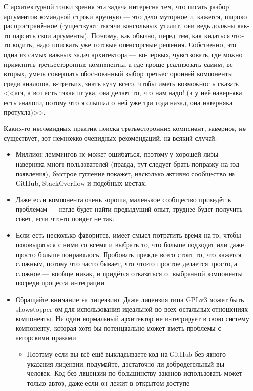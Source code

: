 \documentclass[a5paper]{article}
\begin{document}
С архитектурной точки зрения эта задача интересна тем, что писать разбор аргументов командной строки вручную --- это дело муторное и, кажется, широко распространённое (существуют тысячи консольных утилит, они ведь должны как-то парсить свои аргументы). Поэтому, как обычно, перед тем, как кидаться что-то кодить, надо поискать уже готовые опенсорсные решения. Собственно, это одна из самых важных задач архитектора --- во-первых, чувствовать, где можно применить третьесторонние компоненты, а где проще реализовать самим, во-вторых, уметь совершать обоснованный выбор третьесторонней компоненты среди аналогов, в-третьих, знать кучу всего, чтобы иметь возможность сказать <<ага, а вот есть такая штука, она делает то, что нам надо! (и у неё наверняка есть аналоги, потому что я слышал о ней уже три года назад, она наверняка протухла)>>.

Каких-то неочевидных практик поиска третьесторонних компонент, наверное, не существует, вот немножко очевидных рекомендаций, на всякий случай.
\begin{itemize}
	\item Миллион леммингов не может ошибаться, поэтому у хорошей либы наверняка много пользователей (правда, тут следует брать поправку на год появления), быстрое гугление покажет, насколько активно сообщество на GitHub, StackOverflow и подобных местах.
	\item Даже если компонента очень хороша, маленькое сообщество приведёт к проблемам --- негде будет найти предыдущий опыт, труднее будет получить совет, если что-то пойдёт не так.
	\item Если есть несколько фаворитов, имеет смысл потратить время на то, чтобы поковыряться с ними со всеми и выбрать то, что больше подходит или даже просто больше понравилось. Пробовать прежде всего стоит то, что кажется сложным, потому что часто бывает, что что-то простое делается просто, а сложное --- вообще никак, и придётся отказаться от выбранной компоненты посреди процесса интеграции. 
	\item Обращайте внимание на лицензию. Даже лицензия типа GPLv3 может быть showstopper-ом для использования идеальной во всех остальных отношениях компоненты. Ни один нормальный архитектор не интегрирует в свою систему компоненту, которая хотя бы потенциально может иметь проблемы с авторскими правами.
	\begin{itemize}
		\item Поэтому если вы всё ещё выкладываете код на GitHub без явного указания лицензии, подумайте, достаточно ли добродетельный вы человек. Код без лицензии по большинству законов использовать может только автор, даже если он лежит в открытом доступе.
	\end{itemize}
\end{itemize}
\end{document}
